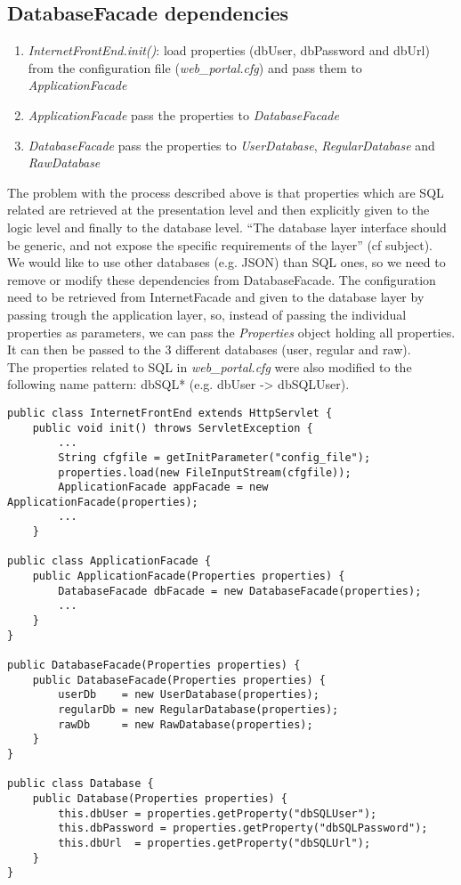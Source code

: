 \subsection{DatabaseFacade dependencies}

\begin{enumerate}
\item \emph{InternetFrontEnd.init()}: load properties (dbUser, dbPassword and
    dbUrl) from the configuration file (\emph{web\_portal.cfg}) and pass them to
    \emph{ApplicationFacade}
    
\item \emph{ApplicationFacade} pass the properties to \emph{DatabaseFacade}

\item \emph{DatabaseFacade} pass the properties to \emph{UserDatabase},
    \emph{RegularDatabase} and \emph{RawDatabase}
\end{enumerate}

The problem with the process described above is that properties which are SQL
related are retrieved at the presentation level and then explicitly given to
the logic level and finally to the database level. ``The database layer
interface should be generic, and not expose the specific requirements of the
layer'' (cf subject).\\

We would like to use other databases (e.g. JSON) than SQL ones, so we need to
remove or modify these dependencies from DatabaseFacade. The configuration need
to be retrieved from InternetFacade and given to the database layer by passing
trough the application layer, so, instead of passing the individual properties
as parameters, we can pass the \emph{Properties} object holding all properties.
It can then be passed to the 3 different databases (user, regular and raw).\\

The properties related to SQL in \emph{web\_portal.cfg} were also modified to
the following name pattern: dbSQL* (e.g. dbUser -> dbSQLUser).\\

\begin{lstlisting}
public class InternetFrontEnd extends HttpServlet {
	public void init() throws ServletException {
		...
		String cfgfile = getInitParameter("config_file");
		properties.load(new FileInputStream(cfgfile));
		ApplicationFacade appFacade = new ApplicationFacade(properties);
        ...
    }

public class ApplicationFacade {
    public ApplicationFacade(Properties properties) {
        DatabaseFacade dbFacade = new DatabaseFacade(properties);
        ...
    }
}

public DatabaseFacade(Properties properties) {
	public DatabaseFacade(Properties properties) {
		userDb    = new UserDatabase(properties);
		regularDb = new RegularDatabase(properties);
		rawDb     = new RawDatabase(properties);
	}
}

public class Database {
	public Database(Properties properties) {
		this.dbUser	= properties.getProperty("dbSQLUser");
		this.dbPassword	= properties.getProperty("dbSQLPassword");
		this.dbUrl	= properties.getProperty("dbSQLUrl");
	}
}
\end{lstlisting}

\newpage
